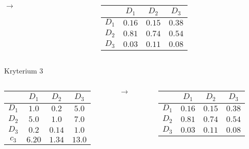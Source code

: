 \documentclass{beamer}
\begin{document}
\begin{frame}[allowframebreaks]
\begin{columns}
\begin{column}{0.1\textwidth}
			$\rightarrow$
		\end{column}
		\begin{column}{0.4\textwidth}
			\begin{table}
				\begin{tabular}{c|c|c|c}
					&	$D_1$	&	$D_2$	&	$D_3$\\ \hline
				$D_1$	&	$0.16$	&	$0.15$	&	$0.38$\\ \hline
				$D_2$	&	$0.81$	&	$0.74$	&	$0.54$\\ \hline
				$D_3$	&	$0.03$	&	$0.11$	&	$0.08$
				\end{tabular}
			\end{table}
		\end{column}
	\end{columns}
	\framebreak
	Kryterium 3
	\begin{columns}
		\begin{column}{0.4\textwidth}
			\begin{table}
				\begin{tabular}{c|c|c|c}
					&	$D_1$	&	$D_2$	&	$D_3$\\ \hline
				$D_1$	&	$1.0$	&	$0.2$	&	$5.0$\\ \hline
				$D_2$	&	$5.0$	&	$1.0$	&	$7.0$\\ \hline
				$D_3$	&	$0.2$	&	$0.14$	&	$1.0$\\ \hline\hline
				$c_3$	&	$6.20$	&	$1.34$	&	$13.0$
				\end{tabular}
			\end{table}
		\end{column}
		\begin{column}{0.1\textwidth}
			$\rightarrow$
		\end{column}
		\begin{column}{0.4\textwidth}
			\begin{table}
				\begin{tabular}{c|c|c|c}
					&	$D_1$	&	$D_2$	&	$D_3$\\ \hline
				$D_1$	&	$0.16$	&	$0.15$	&	$0.38$\\ \hline
				$D_2$	&	$0.81$	&	$0.74$	&	$0.54$\\ \hline
				$D_3$	&	$0.03$	&	$0.11$	&	$0.08$
				\end{tabular}
			\end{table}
		\end{column}
	\end{columns}
\end{frame}
\end{document}
